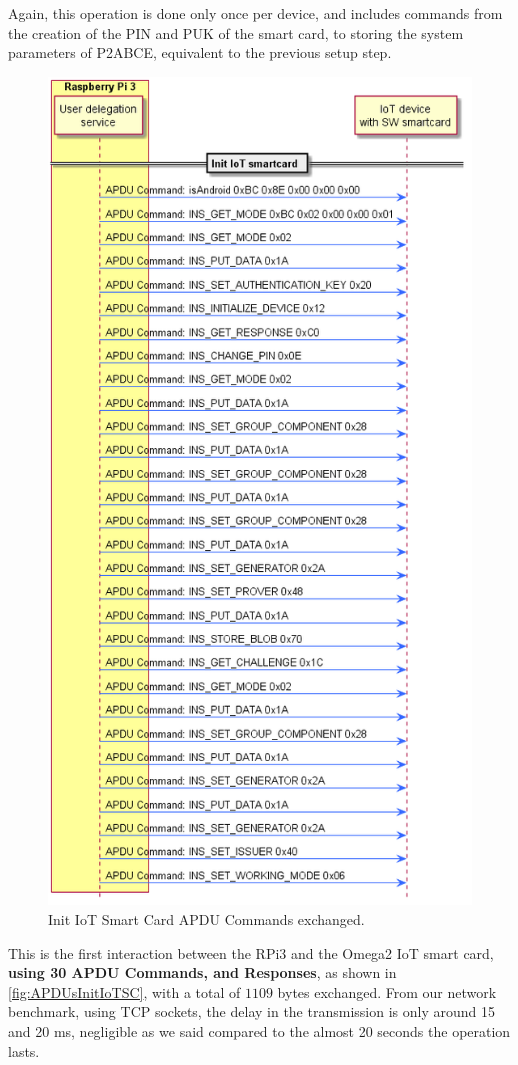 Again, this operation is done only once per device, and includes commands from the creation of the PIN and PUK of the smart card, to storing the system parameters of P2ABCE, equivalent to the previous setup step.


\begin{figure}[bth]
	\begin{center}
		\includegraphics[width=0.8\linewidth]{gfx/APDUsInitIoTSC}
	\end{center}
	\caption{Init IoT Smart Card APDU Commands exchanged.}
	\label{fig:APDUsInitIoTSC}
\end{figure}

This is the first interaction between the RPi3 and the Omega2 IoT smart card, \textbf{using 30 APDU Commands, and Responses}, as shown in \autoref{fig:APDUsInitIoTSC}, with a total of $1109$ bytes exchanged. From our network benchmark, using TCP sockets, the delay in the transmission is only around 15 and 20 ms, negligible as we said compared to the almost 20 seconds the operation lasts.


